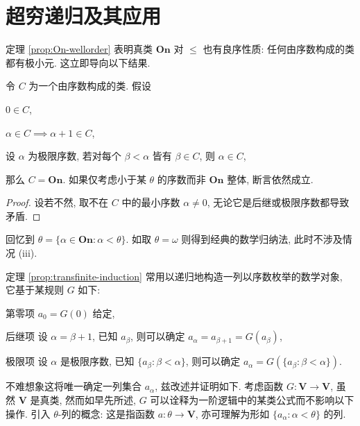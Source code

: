 \section{超穷递归及其应用}
定理 \ref{prop:On-wellorder} 表明真类 $\textbf{On}$ 对 $\leq$ 也有良序性质: 任何由序数构成的类都有极小元. 这立即导向以下结果.
\begin{theorem}[超穷归纳法]\label{prop:transfinite-induction} 
	令 $C$ 为一个由序数构成的类. 假设
	\begin{compactenum}[(i)]
		\item $0 \in C$,
		\item $\alpha \in C \implies \alpha+1 \in C$,
		\item 设 $\alpha$ 为极限序数, 若对每个 $\beta < \alpha$ 皆有 $\beta \in C$, 则 $\alpha \in C$,
	\end{compactenum}
	那么 $C = \textbf{On}$. 如果仅考虑小于某 $\theta$ 的序数而非 $\textbf{On}$ 整体, 断言依然成立.
\end{theorem}
\begin{proof}
	设若不然, 取不在 $C$  中的最小序数 $\alpha \neq 0$, 无论它是后继或极限序数都导致矛盾.
\end{proof}
\begin{remark}
	回忆到 $\theta = \{\alpha \in \textbf{On}: \alpha < \theta \}$. 如取 $\theta = \omega$ 则得到经典的数学归纳法, 此时不涉及情况 (iii).
\end{remark}

定理 \ref{prop:transfinite-induction} 常用以递归地构造一列以序数枚举的数学对象, 它基于某规则 $G$ 如下:
\begin{compactdesc}
	\item[第零项] $a_0 = G(0)$ 给定,
	\item[后继项] 设 $\alpha = \beta+1$, 已知 $a_\beta$, 则可以确定 $a_\alpha = a_{\beta + 1} = G(a_\beta)$,
	\item[极限项] 设 $\alpha$ 是极限序数, 已知 $\{a_\beta : \beta < \alpha \}$, 则可以确定 $a_\alpha = G(\{a_\beta : \beta < \alpha \})$.
\end{compactdesc}
不难想象这将唯一确定一列集合 $a_\alpha$, 兹改述并证明如下. 考虑函数 $G: \textbf{V} \to \textbf{V}$, 虽然 $\textbf{V}$ 是真类, 然而如早先所述, $G$ 可以诠释为一阶逻辑中的某类公式而不影响以下操作. 引入 $\theta$-列的概念: 这是指函数 $a: \theta \to \textbf{V}$, 亦可理解为形如 $\{a_\alpha : \alpha < \theta \}$ 的列.

